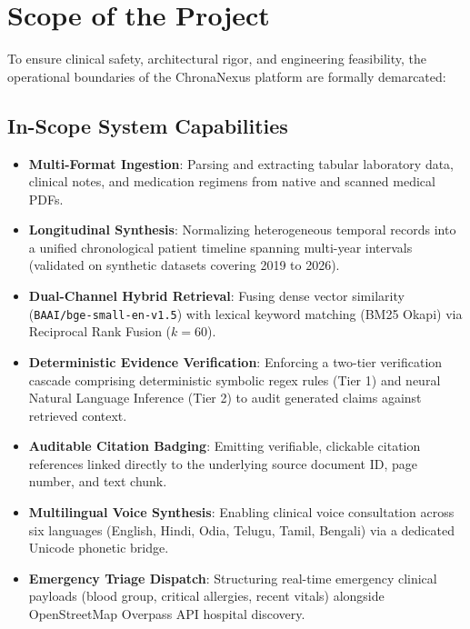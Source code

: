 \section{Scope of the Project}
\label{sec:intro_scope}

To ensure clinical safety, architectural rigor, and engineering feasibility, the operational boundaries of the ChronaNexus platform are formally demarcated:

\subsection{In-Scope System Capabilities}
\begin{itemize}
    \item \textbf{Multi-Format Ingestion}: Parsing and extracting tabular laboratory data, clinical notes, and medication regimens from native and scanned medical PDFs.
    \item \textbf{Longitudinal Synthesis}: Normalizing heterogeneous temporal records into a unified chronological patient timeline spanning multi-year intervals (validated on synthetic datasets covering 2019 to 2026).
    \item \textbf{Dual-Channel Hybrid Retrieval}: Fusing dense vector similarity (\texttt{BAAI/\allowbreak bge-small-\allowbreak en-v1.5}) with lexical keyword matching (BM25 Okapi) via Reciprocal Rank Fusion ($k=60$).
    \item \textbf{Deterministic Evidence Verification}: Enforcing a two-tier verification cascade comprising deterministic symbolic regex rules (Tier 1) and neural Natural Language Inference (Tier 2) to audit generated claims against retrieved context.
    \item \textbf{Auditable Citation Badging}: Emitting verifiable, clickable citation references linked directly to the underlying source document ID, page number, and text chunk.
    \item \textbf{Multilingual Voice Synthesis}: Enabling clinical voice consultation across six languages (English, Hindi, Odia, Telugu, Tamil, Bengali) via a dedicated Unicode phonetic bridge.
    \item \textbf{Emergency Triage Dispatch}: Structuring real-time emergency clinical payloads (blood group, critical allergies, recent vitals) alongside OpenStreetMap Overpass API hospital discovery.
\end{itemize}

